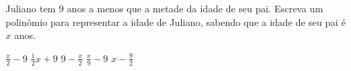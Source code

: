 Juliano tem $9$ anos a menos que a metade da idade de seu pai. Escreva um polinômio para representar a idade de Juliano, sabendo que a idade de seu pai é $x$ anos.

$\frac{x}{2}-9$
$\frac{1}{2}x+9$
$9-\frac{x}{2}$
$\frac{x}{9}-9$
$x-\frac{9}{2}$




